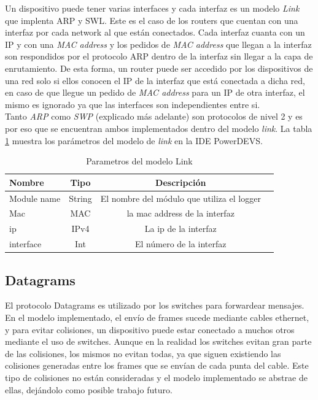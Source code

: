 \documentclass[10pt,a4paper]{article}
\begin{document}
Un dispositivo puede tener varias interfaces y cada interfaz es un modelo \textit{Link} que implenta ARP y SWL. Este es el caso de los routers que cuentan con una interfaz por cada network al que están conectados. Cada interfaz cuanta con un IP y con una \textit{MAC address} y los pedidos de \textit{MAC address} que llegan a la interfaz son respondidos por el protocolo ARP dentro de la interfaz sin llegar a la capa de enrutamiento. De esta forma, un router puede ser accedido por los dispositivos de una red solo si ellos conocen el IP de la interfaz que está conectada a dicha red, en caso de que llegue un pedido de \textit{MAC address} para un IP de otra interfaz, el mismo es ignorado ya que las interfaces son independientes entre si. \\

Tanto \textit{ARP} como \textit{SWP} (explicado más adelante) son protocolos de nivel 2 y es por eso que se encuentran ambos implementados dentro del modelo \textit{link}. La tabla \ref{table: parameters link} muestra los parámetros del modelo de \textit{link} en la IDE PowerDEVS. 

\begin{table}[h]
\begin{tabular}{|l|c|c|c|}
  \hline
  \textbf{Nombre} & \textbf{Tipo} & \textbf{Descripción} \\
  \hline
  Module name & String & El nombre del módulo que utiliza el logger \\
  \hline
  Mac & MAC & la mac address de la interfaz \\
  \hline
  ip & IPv4 & La ip de la interfaz \\
  \hline
  interface & Int & El número de la interfaz \\
  \hline
\end{tabular}
\caption{Parametros del modelo Link}
\label{table: parameters link}
\end{table}

\subsection{Datagrams}
El protocolo Datagrams es utilizado por los switches para forwardear mensajes. \\

En el modelo implementado, el envío de frames sucede mediante cables ethernet, y para evitar colisiones, un dispositivo puede estar conectado a muchos otros mediante el uso de switches. Aunque en la realidad los switches evitan gran parte de las colisiones, los mismos no evitan todas, ya que siguen existiendo las colisiones generadas entre los frames que se envían de cada punta del cable. Este tipo de colisiones no están consideradas y el modelo implementado se abstrae de ellas, dejándolo como posible trabajo futuro. \\
\end{document}
